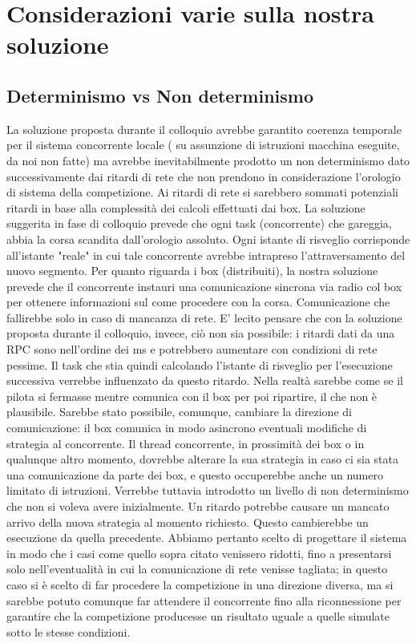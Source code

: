 \section{Considerazioni varie sulla nostra soluzione}
\subsection{Determinismo vs Non determinismo}
La soluzione proposta durante il colloquio avrebbe garantito coerenza temporale per il sistema concorrente locale ( su assunzione di istruzioni macchina eseguite, da noi non fatte) ma avrebbe inevitabilmente prodotto un non determinismo dato successivamente dai ritardi di rete che non prendono in considerazione l’orologio di sistema della competizione. Ai ritardi di rete si sarebbero sommati potenziali ritardi in base alla complessità dei calcoli effettuati dai box. La soluzione suggerita in fase di colloquio prevede che ogni task (concorrente) che gareggia, abbia la corsa scandita dall’orologio assoluto. Ogni istante di risveglio corrisponde all’istante "reale" in cui tale concorrente avrebbe intrapreso l’attraversamento del nuovo segmento. Per quanto riguarda i box (distribuiti), la nostra soluzione prevede che il concorrente instauri una comunicazione sincrona via radio col box per ottenere informazioni sul come procedere con la corsa. Comunicazione che fallirebbe solo in caso di mancanza di rete. E’ lecito pensare che con la soluzione proposta durante il colloquio, invece, ciò non sia possibile: i ritardi dati da una RPC sono nell’ordine dei ms e potrebbero aumentare con condizioni di rete pessime. Il task che stia quindi calcolando l’istante di risveglio per l’esecuzione successiva verrebbe influenzato da questo ritardo. Nella realtà sarebbe come se il pilota si fermasse mentre comunica con il box per poi ripartire, il che non è plausibile. Sarebbe stato possibile, comunque, cambiare la direzione di comunicazione: il box comunica in modo asincrono eventuali modifiche di strategia al concorrente. Il thread concorrente, in prossimità dei box o in qualunque altro momento, dovrebbe alterare la sua strategia in caso ci sia stata una comunicazione da parte dei box, e questo occuperebbe anche un numero limitato di istruzioni. Verrebbe tuttavia introdotto un livello di non determinismo che non si voleva avere inizialmente. Un ritardo potrebbe causare un mancato arrivo della nuova strategia al momento richiesto. Questo cambierebbe un esecuzione da  quella precedente. Abbiamo pertanto scelto di progettare il sistema in modo che i casi come quello sopra citato venissero ridotti, fino a presentarsi solo nell'eventualità in cui la comunicazione di rete venisse tagliata; in questo caso si è scelto di far procedere la competizione in una direzione diversa, ma si sarebbe potuto comunque far attendere il concorrente fino alla riconnessione per garantire che la competizione producesse un risultato uguale a quelle simulate sotto le stesse condizioni.
